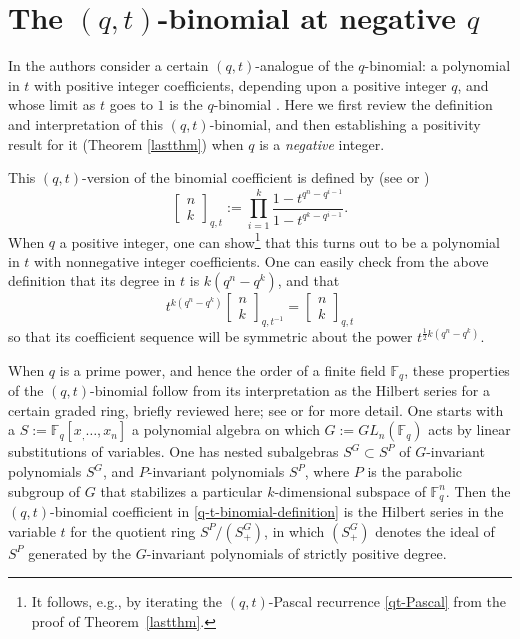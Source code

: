 \documentclass[10pt]{amsart}
\theoremstyle{plain}
\theoremstyle{definition}
\theoremstyle{remark}
\numberwithin{equation}{section}
\newcommand\qbin[3]{\left[\begin{matrix} #1 \\ #2 \end{matrix} \right]_{#3}}
\newcommand\FF{\mathbb{F}}
\begin{document}
 
 
 





























\section{The $(q,t)$-binomial at negative $q$}
\label{q-t-section}


In \cite[p. 43]{RSW} the authors consider a certain
$(q,t)$-analogue of the $q$-binomial: a polynomial in $t$ 
with positive integer coefficients, depending upon
a positive integer $q$, and whose limit as $t$ goes to $1$
is the $q$-binomial \cite[Corollary 3.2]{RS}. 
Here we first review the definition and interpretation
of this $(q,t)$-binomial, and then 
establishing a positivity result for it (Theorem \ref{lastthm})
when $q$ is a {\it negative} integer.


This $(q,t)$-version of the binomial coefficient
is defined by (see  \cite{RS} or \cite[p. 43]{RSW})
\begin{equation}
\label{q-t-binomial-definition}
\qbin{n}{k}{q,t}:=\prod_{i=1}^k \frac{1-t^{q^n-q^{i-1}}}
{1-t^{q^k-q^{i-1}}}.
\end{equation}
When $q$ a positive integer, one can show\footnote{It follows, 
e.g., by iterating the $(q,t)$-Pascal recurrence 
\eqref{qt-Pascal} from the proof of Theorem~\ref{lastthm}.}
that this turns out to be a polynomial in $t$ with 
nonnegative integer coefficients.
One can easily check from the above definition that 
its degree in $t$ is $k(q^n-q^k)$, and that
\begin{equation}
\label{coefficient-symmetry}
t^{k(q^n-q^k)} \qbin{n}{k}{q,t^{-1}}
=
 \qbin{n}{k}{q,t}
\end{equation}
so that its coefficient sequence will be symmetric about the power
$t^{\frac{1}{2} k(q^n-q^k)}$.

When $q$ is a prime power, and hence the order of a finite
field $\FF_q$, these properties of the
$(q,t)$-binomial follow from its interpretation
as the Hilbert series for a certain graded ring, 
briefly reviewed here; see \cite[\S 9]{RSW} or \cite{RS}
for more detail. One starts with a 
$S:=\FF_q[x_,\ldots,x_n]$ a polynomial algebra
on which $G:=GL_n(\FF_q)$ acts by linear substitutions of variables.
One has nested subalgebras $S^G \subset S^P$ of 
$G$-invariant polynomials $S^G$, and $P$-invariant polynomials $S^P$, where
$P$ is the parabolic subgroup of $G$ that stabilizes a particular $k$-dimensional
subspace of $\FF_q^n$.  Then the $(q,t)$-binomial coefficient in \eqref{q-t-binomial-definition}
is the Hilbert series in the variable $t$ for the quotient ring $S^P/(S^G_+)$, in which
$(S^G_+)$ denotes the ideal of  $S^P$ generated by the $G$-invariant polynomials
of strictly positive degree.
\end{document}
